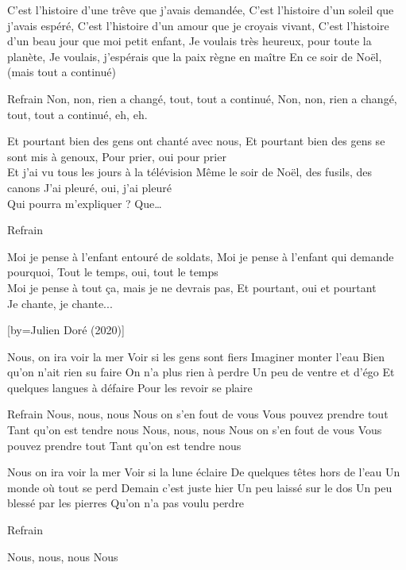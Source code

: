 \beginverse
C'est l'histoire d'une trêve que j'avais demandée,
C'est l'histoire d'un soleil que j'avais espéré,
C'est l'histoire d'un amour que je croyais vivant,
C'est l'histoire d'un beau jour que moi petit enfant,
Je voulais très heureux, pour toute la planète,
Je voulais, j'espérais que la paix règne en maître
En ce soir de Noël, (mais tout a continué) \\[3x]
\endverse

\beginverse
Refrain
Non, non, rien a changé, tout, tout a continué,
Non, non, rien a changé, tout, tout a continué, eh, eh.
\endverse

\beginverse
Et pourtant bien des gens ont chanté avec nous,
Et pourtant bien des gens se sont mis à genoux,
Pour prier, oui pour prier \\[bis]
Et j'ai vu tous les jours à la télévision
Même le soir de Noël, des fusils, des canons
J'ai pleuré, oui, j'ai pleuré \\[bis]
Qui pourra m'expliquer ? Que…
\endverse

\beginverse
Refrain
\endverse

\beginverse
Moi je pense à l'enfant entouré de soldats,
Moi je pense à l'enfant qui demande pourquoi,
Tout le temps, oui, tout le temps \\[bis]
Moi je pense à tout ça, mais je ne devrais pas,
Et pourtant, oui et pourtant \\[bis]
Je chante, je chante...
\endverse

[by={Julien Doré (2020)}]

\beginverse
Nous, on ira voir la mer
Voir si les gens sont fiers
Imaginer monter l'eau
Bien qu'on n'ait rien su faire
On n'a plus rien à perdre
Un peu de ventre et d'égo
Et quelques langues à défaire
Pour les revoir se plaire
\endverse

\beginverse
Refrain
Nous, nous, nous
Nous on s'en fout de vous
Vous pouvez prendre tout
Tant qu'on est tendre nous
Nous, nous, nous
Nous on s'en fout de vous
Vous pouvez prendre tout
Tant qu'on est tendre nous
\endverse

\beginverse
Nous on ira voir la mer
Voir si la lune éclaire
De quelques têtes hors de l'eau
Un monde où tout se perd
Demain c'est juste hier
Un peu laissé sur le dos
Un peu blessé par les pierres
Qu'on n'a pas voulu perdre
\endverse

\beginverse
Refrain
\endverse

\beginverse
Nous, nous, nous
Nous
\\[bis]
\endverse

